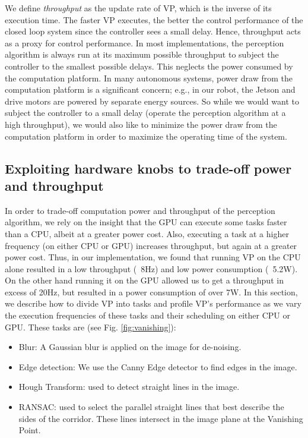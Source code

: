  We define \textit{throughput} as the update rate of VP, which is the inverse of its execution time. 
 The faster VP executes, the better the control performance of the closed loop system since the controller sees a small delay. 
 Hence, throughput acts as a proxy for control performance. 
 In most implementations, the perception algorithm is always run at its maximum possible throughput to subject the controller to the smallest possible delays.
 This neglects the power consumed by the computation platform.
 In many autonomous systems, power draw from the computation platform is a significant concern; e.g., in our robot, the Jetson and drive motors are powered by separate energy sources.
 So while we would want to subject the controller to a small delay (operate the perception algorithm at a high throughput), we would also like to minimize the power draw from the computation platform in order to maximize the operating time of the system. 
  

\subsection{Exploiting hardware knobs to trade-off power and throughput}

In order to trade-off computation power and throughput of the perception algorithm, we rely on the insight that the GPU can execute some tasks faster than a CPU, albeit at a greater power cost.
Also, executing a task at a higher frequency (on either CPU or GPU) increases throughput, but again at a greater power cost.
Thus, in our implementation, we found that running VP on the CPU alone resulted in a low throughput (~8Hz) and low power consumption (~5.2W). 
On the other hand running it on the GPU allowed us to get a throughput in excess of 20Hz, but resulted in a power consumption of over 7W. 
In this section, we describe how to divide VP into tasks and profile VP's performance as we vary the execution frequencies of these tasks and their scheduling on either CPU or GPU.
These tasks are (see Fig. \ref{fig:vanishing}):

\begin{itemize}
\item Blur: A Gaussian blur is applied on the image for de-noising.
\item Edge detection: We use the Canny Edge detector to find edges in the image.
\item Hough Transform: used to detect straight lines in the image.
\item RANSAC: used to select the parallel straight lines that best describe the sides of the corridor. These lines intersect in the image plane at the Vanishing Point.
\end{itemize}

